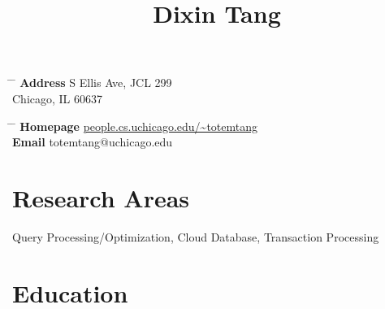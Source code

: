 \documentclass[10pt]{article} %
\begin{document}

\title{Dixin Tang} %


\parbox{0.5\textwidth}{ %
\begin{tabbing} %
\hspace{2.5cm} \= \hspace{4cm} \= \kill %
{\bf Address}  S Ellis Ave, JCL 299 \\ %
\> Chicago, IL 60637 \\ %
\end{tabbing}}
\hfill %
\parbox{0.5\textwidth}{ %
\begin{tabbing} %
\hspace{2.5cm} \= \hspace{4cm} \= \kill %
{\bf Homepage} \> \href{http://people.cs.uchicago.edu/~totemtang}{\url{people.cs.uchicago.edu/~totemtang}} \\ 
{\bf Email} \> totemtang@uchicago.edu \\ %
\end{tabbing}}
\vspace{-10mm}

\section{Research Areas}

Query Processing/Optimization, Cloud Database, Transaction Processing

\vspace{-5mm}

\section{Education}
\end{document}

